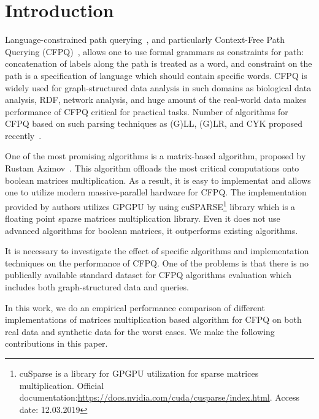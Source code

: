 \section{Introduction}

Language-constrained path querying~\cite{FLCpathProblem}, and particularly Context-Free Path Querying (CFPQ)~\cite{Yannakakis}, allows one to use formal grammars as constraints for path: concatenation of labels along the path is treated as a word, and constraint on the path is a specification of language which should contain specific words.
CFPQ is widely used for graph-structured data analysis in such domains as biological data analysis, RDF, network analysis, and huge amount of the real-world data makes performance of CFPQ critical for practical tasks.
Number of algorithms for CFPQ based on such parsing techniques as (G)LL, (G)LR, and CYK proposed recently~\cite{hellingsPathQuerying,Grigorev:2017:CPQ:3166094.3166104,Verbitskaia:2018:PCC:3241653.3241655,RDF,10.1007/978-3-319-91662-0_17,Medeiros:2018:EEC:3167132.3167265}.

One of the most promising algorithms is a matrix-based algorithm, proposed by Rustam Azimov~\cite{Azimov:2018:CPQ:3210259.3210264}.
This algorithm offloads the most critical computations onto boolean matrices multiplication.
As a result, it is easy to implementat and allows one to utilize modern massive-parallel hardware for CFPQ.
The implementation provided by authors utilizes GPGPU by using cuSPARSE\footnote{cuSparse is a library for GPGPU utilization for sparse matrices multiplication. Official documentation:\url{https://docs.nvidia.com/cuda/cusparse/index.html}. Access date: 12.03.2019} library which is a floating point sparse matrices multiplication library.
Even it does not use advanced algorithms for boolean matrices, it outperforms existing algorithms.

It is necessary to investigate the effect of specific algorithms and implementation techniques on the performance of CFPQ.
One of the problems is that there is no publically available standard dataset for CFPQ algorithms evaluation which includes both graph-structured data and queries.

In this work, we do an empirical performance comparison of different implementations of matrices multiplication based algorithm for CFPQ on both real data and synthetic data for the worst cases.
We make the following contributions in this paper.

